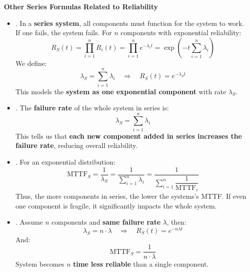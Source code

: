 \newpage

\begin{flushleft}
    \textcolor{Green3}{ \textbf{Other Series Formulas Related to Reliability}}
\end{flushleft}
\begin{itemize}
    \item {}. In a \textbf{series system}, all components must function for the system to work. If one fails, the system fails. For $n$ components with exponential reliability:
    \begin{equation}
        R_S(t) = \displaystyle\prod_{i=1}^{n} R_i(t) = \displaystyle\prod_{i=1}^{n} e^{-\lambda_i t} = \exp\left(-t \displaystyle \sum_{i=1}^n \lambda_i\right)
    \end{equation}
    We define:
    \begin{equation}
        \lambda_S = \sum_{i=1}^n \lambda_i \quad \Longrightarrow \quad R_S(t) = e^{-\lambda_S t}
    \end{equation}
    This models the \textbf{system as one exponential component} with rate $\lambda_S$.


    \item {}. The \textbf{failure rate} of the whole system in series is:
    \begin{equation}
        \lambda_S = \displaystyle\sum_{i=1}^{n} \lambda_i
    \end{equation}
    This tells us that \textbf{each new component added in series increases the failure rate}, reducing overall reliability.


    \item {}. For an exponential distribution:
    \begin{equation}
        \text{MTTF}_{S} = \dfrac{1}{\lambda_{S}} = \dfrac{1}{\displaystyle\sum_{i=1}^{n} \lambda_{i}} = \dfrac{1}{\displaystyle\sum_{i=1}^{n} \dfrac{1}{\text{MTTF}_{i}}}
    \end{equation}
    Thus, the more components in series, the lower the systems's MTTF. If even one component is fragile, it significantly impacts the whole system.


    \item {}. Assume $n$ components and \textbf{same failure rate} $\lambda$, then:
    \begin{equation}
        \lambda_{S} = n \cdot \lambda \quad \Longrightarrow \quad R_{S}(t) = e^{-n \lambda t}
    \end{equation}
    And:
    \begin{equation}
        \text{MTTF}_{S} = \dfrac{1}{n \cdot \lambda}
    \end{equation}
    System becomes $n$ \textbf{time less reliable} than a single component.


\end{itemize}

